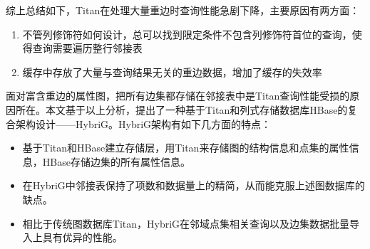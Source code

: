 \vspace{2mm}

综上总结如下，Titan在处理大量重边时查询性能急剧下降，主要原因有两方面：
\begin{enumerate}
    \item 不管列修饰符如何设计，总可以找到限定条件不包含列修饰符首位的查询，使得查询需要遍历整行邻接表
    \item 缓存中存放了大量与查询结果无关的重边数据，增加了缓存的失效率
\end{enumerate}

\vspace{3mm}

面对富含重边的属性图，把所有边集都存储在邻接表中是Titan查询性能受损的原因所在。本文基于以上分析，提出了一种基于Titan和列式存储数据库HBase的复合架构设计——HybriG。HybriG架构有如下几方面的特点：
\begin{itemize}
  \item 基于Titan和HBase建立存储层，用Titan来存储图的结构信息和点集的属性信息，HBase存储边集的所有属性信息。
  \item 在HybriG中邻接表保持了项数和数据量上的精简，从而能克服上述图数据库的缺点。
  \item 相比于传统图数据库Titan，HybriG在邻域点集相关查询以及边集数据批量导入上具有优异的性能。
\end{itemize}


